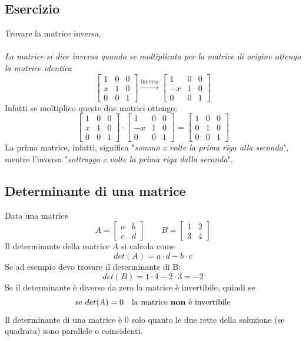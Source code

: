 \documentclass[italian]{article}
\begin{document}
\subsection{Esercizio}
Trovare la matrice inversa.\\\\
\textit{La matrice si dice inversa quando se moltiplicata per la matrice di origine ottengo la matrice identica}\\
\[
	\begin{bmatrix}
		1 & 0 & 0 \\
		x & 1 & 0 \\
		0 & 0 & 1
	\end{bmatrix}
	\xrightarrow{\text{inversa}}
	\begin{bmatrix}
		1 & 0 & 0 \\
		-x & 1 & 0 \\
		0 & 0 & 1
	\end{bmatrix}
\]
Infatti se moltiplico queste due matrici ottengo:
\[
	\begin{bmatrix}
		1 & 0 & 0 \\
		x & 1 & 0 \\
		0 & 0 & 1
	\end{bmatrix}
	\cdot
	\begin{bmatrix}
		1 & 0 & 0 \\
		-x & 1 & 0 \\
		0 & 0 & 1
	\end{bmatrix}
	=
	\begin{bmatrix}
		1 & 0 & 0 \\
		0 & 1 & 0 \\
		0 & 0 & 1
	\end{bmatrix}
\]
La prima matrice, infatti, significa "\textit{sommo x volte la prima riga alla seconda}", mentre l'inversa "\textit{sottraggo x volte la prima riga dalla seconda}".

\subsection{Determinante di una matrice}
Data una matrice
\[
	A =
	\begin{bmatrix}
		a & b \\
		c & d
	\end{bmatrix}
	\qquad
	B =
	\begin{bmatrix}
		1 & 2 \\
		3 & 4
	\end{bmatrix}
\]
Il determinante della matrice $A$ si calcola come 
\[
	det(A) = a\cdot d - b \cdot c
\]
Se ad esempio devo trovare il determinante di B:
\[
	det(B) = 1 \cdot 4 - 2 \cdot 3 = -2
\]
Se il determinante è diverso da zero la matrice è invertibile, quindi se
\[
	\text{se } det(A) = 0 \quad \text{la matrice \textbf{non} è invertibile}
\]
Il determinante di una matrice è $0$ solo quanto le due rette della soluzione (se quadrata) sono parallele o coincidenti.
\end{document}
